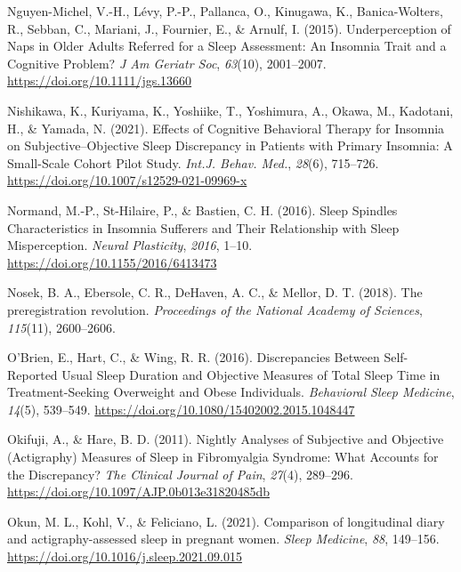 \documentclass[
]{article}
\newlength{\cslhangindent}
\newenvironment{CSLReferences}[2] %
 {\begin{list}{}{%
  \setlength{\itemindent}{0pt}
  \setlength{\leftmargin}{0pt}
  \setlength{\parsep}{0pt}
  \ifodd #1
   \setlength{\leftmargin}{\cslhangindent}
   \setlength{\itemindent}{-1\cslhangindent}
  \fi
  \setlength{\itemsep}{#2\baselineskip}}}
 {\end{list}}
\begin{document}
\begin{CSLReferences}{1}{0}
Nguyen-Michel, V.-H., Lévy, P.-P., Pallanca, O., Kinugawa, K., Banica-Wolters, R., Sebban, C., Mariani, J., Fournier, E., \& Arnulf, I. (2015). Underperception of {Naps} in {Older} {Adults} {Referred} for a {Sleep} {Assessment}: {An} {Insomnia} {Trait} and a {Cognitive} {Problem}? \emph{J Am Geriatr Soc}, \emph{63}(10), 2001--2007. \url{https://doi.org/10.1111/jgs.13660}

Nishikawa, K., Kuriyama, K., Yoshiike, T., Yoshimura, A., Okawa, M., Kadotani, H., \& Yamada, N. (2021). Effects of {Cognitive} {Behavioral} {Therapy} for {Insomnia} on {Subjective}--{Objective} {Sleep} {Discrepancy} in {Patients} with {Primary} {Insomnia}: A {Small}-{Scale} {Cohort} {Pilot} {Study}. \emph{Int.J. Behav. Med.}, \emph{28}(6), 715--726. \url{https://doi.org/10.1007/s12529-021-09969-x}

Normand, M.-P., St-Hilaire, P., \& Bastien, C. H. (2016). Sleep {Spindles} {Characteristics} in {Insomnia} {Sufferers} and {Their} {Relationship} with {Sleep} {Misperception}. \emph{Neural Plasticity}, \emph{2016}, 1--10. \url{https://doi.org/10.1155/2016/6413473}

Nosek, B. A., Ebersole, C. R., DeHaven, A. C., \& Mellor, D. T. (2018). The preregistration revolution. \emph{Proceedings of the National Academy of Sciences}, \emph{115}(11), 2600--2606.

O'Brien, E., Hart, C., \& Wing, R. R. (2016). Discrepancies {Between} {Self}-{Reported} {Usual} {Sleep} {Duration} and {Objective} {Measures} of {Total} {Sleep} {Time} in {Treatment}-{Seeking} {Overweight} and {Obese} {Individuals}. \emph{Behavioral Sleep Medicine}, \emph{14}(5), 539--549. \url{https://doi.org/10.1080/15402002.2015.1048447}

Okifuji, A., \& Hare, B. D. (2011). Nightly {Analyses} of {Subjective} and {Objective} ({Actigraphy}) {Measures} of {Sleep} in {Fibromyalgia} {Syndrome}: {What} {Accounts} for the {Discrepancy}? \emph{The Clinical Journal of Pain}, \emph{27}(4), 289--296. \url{https://doi.org/10.1097/AJP.0b013e31820485db}

Okun, M. L., Kohl, V., \& Feliciano, L. (2021). Comparison of longitudinal diary and actigraphy-assessed sleep in pregnant women. \emph{Sleep Medicine}, \emph{88}, 149--156. \url{https://doi.org/10.1016/j.sleep.2021.09.015}


\end{CSLReferences}
\end{document}
